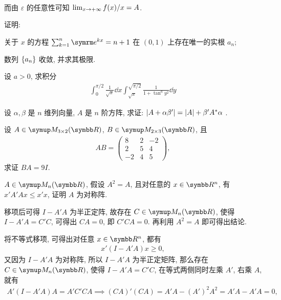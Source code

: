 \begin{exercise}[series=exer]
\begin{answer}
\begin{align*}
        \end{align*}
        而由 $ \varepsilon $ 的任意性可知 $ \lim_{x \to +\infty} f(x)/x = A $.
    \end{answer}
    \item 证明: \begin{exercise}
        \item 关于 $ x $ 的方程 $ \sum_{k=1}^{n} \me^{kx} = n + 1 $ 在 $ (0, 1) $ 上存在唯一的实根 $ a_{n} $;
        \item 数列 $ \qty{a_{n}} $ 收敛, 并求其极限.
    \end{exercise}
    \item 设 $ a > 0 $, 求积分
    \begin{align*}
        \int_{0}^{\pi/2} \frac{1}{\sqrt{x}} \dd{x} \int_{\sqrt{x}}^{\sqrt{\pi/2}} \frac{1}{1 + \tan^{a}y^{2}} \dd{y}
    \end{align*}
    \item 设 $ \alpha, \beta $ 是 $ n $ 维列向量, $ A $ 是 $ n $ 阶方阵, 求证: $ \abs{A + \alpha\beta'} = \abs{A} + \beta'A^{*}\alpha $ . 
    \item 设 $ A \in \MM[\R][3\times 2] $, $ B \in \MM[\R][2 \times 3] $, 且
    \begin{align*}
        AB = \begin{pmatrix}
            8 & 2 & -2 \\
            2 & 5 & 4 \\
            -2 & 4 & 5
        \end{pmatrix},
    \end{align*}
    求证 $ BA = 9 I $. 
    \item $ A\in \MM $, 假设 $ A^{2} = A $, 且对任意的 $ x \in \R^{n} $, 有 $ x'A'Ax \le x'x $, 证明 $ A $ 为对称阵.
    \begin{hint}
        移项后可得 $ I - A'A $ 为半正定阵, 故存在 $ C \in \MM $, 使得 $ I - A'A = C'C $, 可得出 $ CA = 0 $, 即 $ C'CA = 0 $. 再利用 $ A^{2} = A $ 即可得出结论.
    \end{hint}
    \begin{answer}
        将不等式移项, 可得出对任意 $ x \in \R^{n} $, 都有
        \begin{align*}
            x'(I - A'A)x \ge 0,
        \end{align*}
        又因为 $ I - A'A $ 为对称阵, 所以 $ I - A'A $ 为半正定矩阵, 那么存在 $ C \in \MM $, 使得 $ I - A'A = C'C $, 在等式两侧同时左乘 $ A' $, 右乘 $ A $, 就有
        \begin{align*}
            A'(I - A'A)A = A'C'CA \implies (CA)'(CA) = A'A - (A')^{2}A^{2} = A'A - A'A = 0,

\end{align*}
\end{answer}
\end{exercise}
